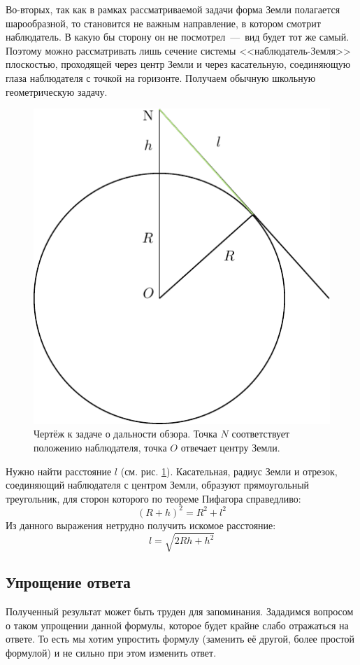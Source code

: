 \documentclass[a4paper,9pt,russian]{article}
\begin{document}
\par
Во\--вторых, так как в рамках рассматриваемой задачи форма Земли полагается шарообразной, то становится не важным направление, в котором смотрит наблюдатель. В какую бы сторону он не посмотрел~\----~вид будет тот же самый. Поэтому можно рассматривать лишь сечение системы <<наблюдатель\--Земля>> плоскостью, проходящей через центр Земли и через касательную, соединяющую глаза наблюдателя с точкой на горизонте. Получаем обычную школьную геометрическую задачу.
\begin{figure}[h]
 \centering
 \includegraphics[scale = 0.8]{first1.pdf}
 \caption{Чертёж к задаче о дальности обзора. Точка $N$ соответствует положению наблюдателя, точка $O$ отвечает центру Земли.}
 \label{fig:1}
\end{figure}
\par
Нужно найти расстояние $l$ (см. рис. \ref{fig:1}). Касательная, радиус Земли и отрезок, соединяющий наблюдателя с центром Земли, образуют прямоугольный треугольник, для сторон которого по теореме Пифагора справедливо:
\begin{equation}
 (R+h)^2 = R^2 + l^2
\end{equation}
Из данного выражения нетрудно получить искомое расстояние:
\begin{equation}\label{eq:1}
 l = \sqrt{2Rh + h^2}
\end{equation}

\subsection{Упрощение ответа}
Полученный результат может быть труден для запоминания. Зададимся вопросом о таком упрощении данной формулы, которое будет крайне слабо отражаться на ответе. То есть мы хотим упростить формулу (заменить её другой, более простой формулой) и не сильно при этом изменить ответ.
\end{document}
